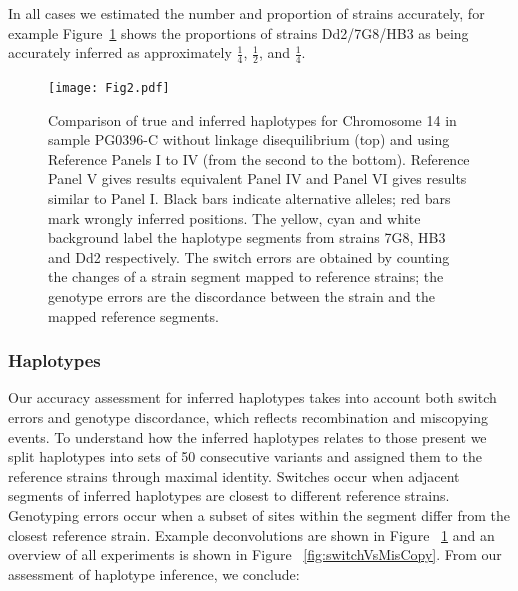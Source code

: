 \documentclass{bioinfo}
\begin{document}
\noindent In all cases we estimated the number and proportion of strains accurately, for example Figure~\ref{fig:differentRefPanel} shows the proportions of strains Dd2/7G8/HB3 as being accurately inferred as approximately $\frac{1}{4}$, $\frac{1}{2}$, and $\frac{1}{4}$.

\begin{figure}[htb]
\centerline{
\texttt{[image: Fig2.pdf]}
}
\caption{Comparison of true and inferred haplotypes for Chromosome 14 in sample {\textmd PG0396-C} without linkage disequilibrium (top) and using Reference Panels I to IV (from the second to the bottom). Reference Panel V gives results equivalent Panel IV and Panel VI gives results similar to Panel I.  Black bars indicate alternative alleles; red bars mark wrongly inferred positions. The yellow, cyan and white background label the haplotype segments from strains 7G8, HB3 and Dd2 respectively. The switch errors are obtained by counting the changes of a strain segment mapped to reference strains; the genotype errors are the discordance between the strain and the mapped reference segments.}
\label{fig:differentRefPanel}
\end{figure}


\subsubsection{Haplotypes}

Our accuracy assessment for inferred haplotypes takes into account both switch errors and genotype discordance, which reflects recombination and miscopying events. To understand how the inferred haplotypes relates to those present we split haplotypes into sets of 50 consecutive variants and assigned them to the reference strains through maximal identity.  Switches occur when adjacent segments of inferred haplotypes are closest to different reference strains.  Genotyping errors occur when a subset of sites within the segment differ from the closest reference strain.  Example deconvolutions are shown in Figure ~\ref{fig:differentRefPanel} and an overview of all experiments is shown in Figure ~\ref{fig:switchVsMisCopy}.  From our assessment of haplotype inference, we conclude:
\end{document}
